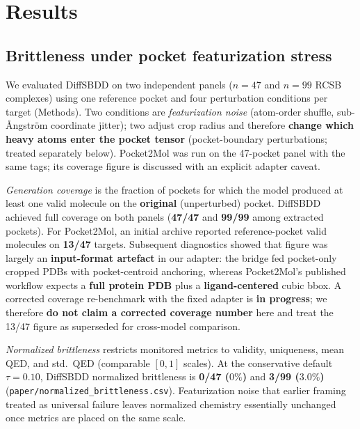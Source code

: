 \documentclass[11pt]{article}
\begin{document}
\section{Results}

\subsection{Brittleness under pocket featurization stress}

We evaluated DiffSBDD on two independent panels ($n=47$ and $n=99$ RCSB complexes) using one reference pocket and four perturbation conditions per target (Methods). Two conditions are \emph{featurization noise} (atom-order shuffle, sub-\r{A}ngstr\"{o}m coordinate jitter); two adjust crop radius and therefore \textbf{change which heavy atoms enter the pocket tensor} (pocket-boundary perturbations; treated separately below). Pocket2Mol was run on the 47-pocket panel with the same tags; its coverage figure is discussed with an explicit adapter caveat.

\emph{Generation coverage} is the fraction of pockets for which the model produced at least one valid molecule on the \textbf{original} (unperturbed) pocket. DiffSBDD achieved full coverage on both panels (\textbf{47/47} and \textbf{99/99} among extracted pockets). For Pocket2Mol, an initial archive reported reference-pocket valid molecules on \textbf{13/47} targets. Subsequent diagnostics showed that figure was largely an \textbf{input-format artefact} in our adapter: the bridge fed pocket-only cropped PDBs with pocket-centroid anchoring, whereas Pocket2Mol's published workflow expects a \textbf{full protein PDB} plus a \textbf{ligand-centered} cubic bbox. A corrected coverage re-benchmark with the fixed adapter is \textbf{in progress}; we therefore \textbf{do not claim a corrected coverage number} here and treat the 13/47 figure as superseded for cross-model comparison.

\emph{Normalized brittleness} restricts monitored metrics to validity, uniqueness, mean QED, and std.\ QED (comparable $[0,1]$ scales). At the conservative default $\tau=0.10$, DiffSBDD normalized brittleness is \textbf{0/47 ($0\%$)} and \textbf{3/99 ($3.0\%$)} (\texttt{paper/normalized\_brittleness.csv}). Featurization noise that earlier framing treated as universal failure leaves normalized chemistry essentially unchanged once metrics are placed on the same scale.
\end{document}
